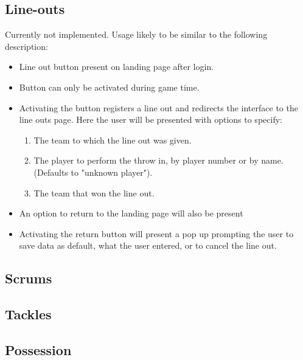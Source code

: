 \documentclass[hidelinks,a4paper,12pt]{article}
\begin{document}
	\subsection{Line-outs}
	Currently not implemented. Usage likely to be similar to the following description:
	\begin{itemize}
		\item Line out button present on landing page after login.
		\item Button can only be activated during game time.
		\item Activating the button registers a line out and redirects the interface to the line outs page. Here the user will be presented with options to specify:
			\begin{enumerate}
				\item The team to which the line out was given.
				\item The player to perform the throw in, by player number or by name. (Defaults to "unknown player").
				\item The team that won the line out.
			\end{enumerate}
		\item An option to return to the landing page will also be present
		\item Activating the return button will present a pop up prompting the user to save data as default, what the user entered, or to cancel the line out.
	\end{itemize}

	\subsection{Scrums}

	\subsection{Tackles}

	\subsection{Possession}
\end{document}
